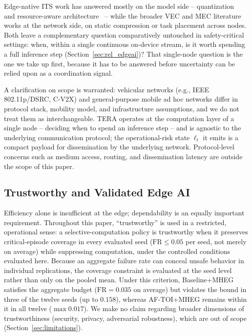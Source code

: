 \documentclass[a4paper,fleqn]{cas-dc}
\begin{document}
Edge-native ITS work has answered mostly
on the model side -- quantization~\cite{hariharan2023driveredge} and resource-aware
architecture~\cite{almodhwahi2025facial} -- while the broader VEC and MEC literature
works at the network side, on static compression or task placement across nodes.
Both leave a complementary question comparatively untouched in safety-critical
settings: when, within a single continuous on-device stream, is it worth
spending a full inference step (Section~\ref{sec:rel_edgeai})? That single-node
question is the one we take up first, because it has to be answered before
uncertainty can be relied upon as a coordination signal.

{\color{\revcolor}A clarification on scope is warranted: vehicular networks (e.g.,
IEEE 802.11p/DSRC, C-V2X) and general-purpose mobile ad hoc networks differ in
protocol stack, mobility model, and infrastructure assumptions, and we do not
treat them as interchangeable. TERA operates at the computation layer
of a single node -- deciding when to spend an inference step -- and is
agnostic to the underlying communication protocol; the operational-risk state
$\ell_t$ it emits is a compact payload for dissemination by the underlying
network. Protocol-level concerns such as medium access, routing, and
dissemination latency are outside the scope of this paper.}
\subsection{Trustworthy and Validated Edge AI}
\label{sec:rel_trust}
Efficiency alone is insufficient at the edge; dependability is an equally important requirement.
{\color{\revcolor}Throughout this paper, ``trustworthy'' is used in a restricted,
operational sense: a selective-computation policy is trustworthy when it
preserves critical-episode coverage in every evaluated seed
($\mathrm{FR} \le 0.05$ per seed, not merely on average) while suppressing
computation, under the controlled conditions evaluated here. Because an
aggregate failure rate can conceal unsafe behavior in individual
replications, the coverage constraint is evaluated at the seed level rather
than only on the pooled mean. Under this criterion, Baseline+MHEG satisfies
the aggregate budget ($\mathrm{FR}=0.035$ on average) but violates the bound
in three of the twelve seeds (up to $0.158$), whereas \mbox{AF-TOI}+MHEG
remains within it in all twelve ($\max 0.017$). We make no claim
regarding broader dimensions of trustworthiness (security, privacy, adversarial
robustness), which are out of scope (Section~\ref{sec:limitations}).}
\end{document}
